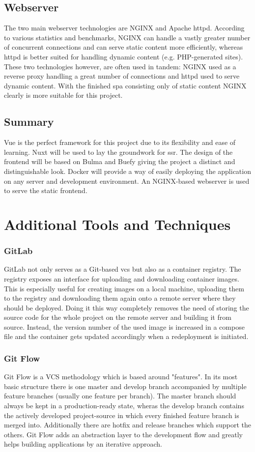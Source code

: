 \subsection{Webserver}
The two main webserver technologies are NGINX and Apache httpd. According to various statistics and benchmarks, NGINX can handle a vastly greater number of concurrent connections and can serve static content more efficiently, whereas httpd is better suited for handling dynamic content (e.g. PHP-generated sites). These two technologies however, are often used in tandem: NGINX used as a reverse proxy handling a great number of connections and httpd used to serve dynamic content. With the finished \acrfull{spa} consisting only of static content NGINX clearly is more suitable for this project.

\subsection{Summary}
Vue is the perfect framework for this project due to its flexibility and ease of learning. Nuxt will be used to lay the groundwork for \acrshort{ssr}. The design of the frontend will be based on Bulma and Buefy giving the project a distinct and distinguishable look. Docker will provide a way of easily deploying the application on any server and development environment. An NGINX-based webserver is used to serve the static frontend.

\section{Additional Tools and Techniques}
\subsubsection{GitLab}
GitLab not only serves as a Git-based \acrfull{vcs} but also as a container registry. The registry exposes an interface for uploading and downloading container images. This is especially useful for creating images on a local machine, uploading them to the registry and downloading them again onto a remote server where they should be deployed. Doing it this way completely removes the need of storing the source code for the whole project on the remote server and building it from source. Instead, the version number of the used image is increased in a compose file and the container gets updated accordingly when a redeployment is initiated.

\subsubsection{Git Flow}
Git Flow is a VCS methodology which is based around "features". In its most basic structure there is one master and develop branch accompanied by multiple feature branches (usually one feature per branch). The master branch should always be kept in a production-ready state, wheras the develop branch contains the actively developed project-source in which every finished feature branch is merged into. Additionally there are hotfix and release branches which support the others. Git Flow adds an abstraction layer to the development flow and greatly helps building applications by an iterative approach.

